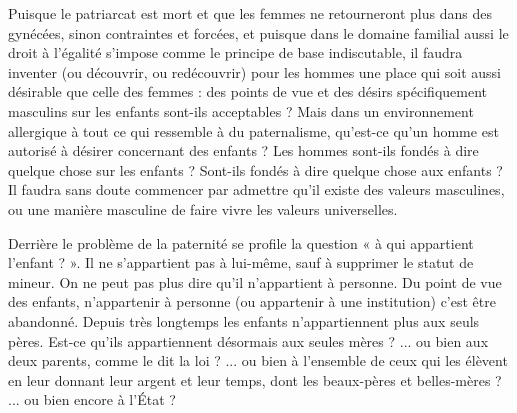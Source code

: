  Puisque le patriarcat est mort et que les femmes ne retourneront plus dans des gynécées, sinon contraintes et forcées, et puisque dans le domaine familial aussi le droit à l'égalité s'impose comme le principe de base indiscutable, il faudra inventer (ou découvrir, ou redécouvrir) pour les hommes une place qui soit aussi désirable que celle des femmes : des points de vue et des désirs spécifiquement masculins sur les enfants sont-ils acceptables ? Mais dans un environnement allergique à tout ce qui ressemble à du paternalisme, qu'est-ce qu'un homme est autorisé à désirer concernant des enfants ? Les hommes sont-ils fondés à dire quelque chose sur les enfants ? Sont-ils fondés à dire quelque chose aux enfants ? Il faudra sans doute commencer par admettre qu'il existe des valeurs masculines, ou une manière masculine de faire vivre les valeurs universelles.

 Derrière le problème de la paternité se profile la question « à qui appartient l'enfant ? ». Il ne s'appartient pas à lui-même, sauf à supprimer le statut de mineur. On ne peut pas plus dire qu'il n'appartient à personne. Du point de vue des enfants, n'appartenir à personne (ou appartenir à une institution) c'est être abandonné. Depuis très longtemps les enfants n'appartiennent plus aux seuls pères. Est-ce qu'ils appartiennent désormais aux seules mères ? ... ou bien aux deux parents, comme le dit la loi ? ... ou bien à l'ensemble de ceux qui les élèvent en leur donnant leur argent et leur temps, dont les beaux-pères et belles-mères ? ... ou bien encore à l'État ?


